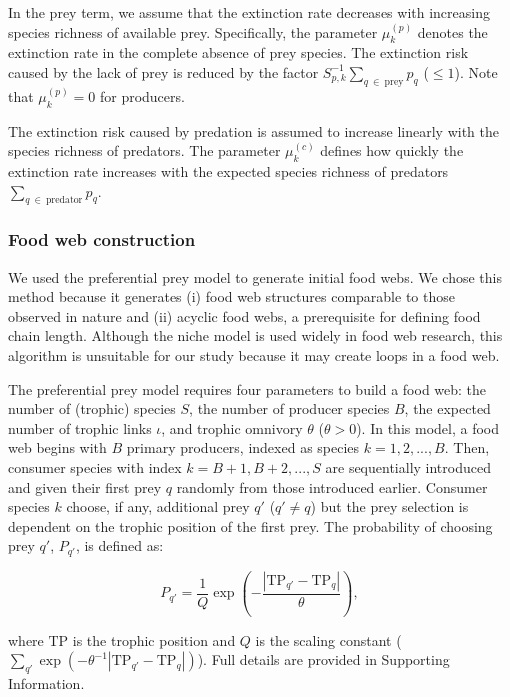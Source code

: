 \documentclass[11pt, class=article, crop=false]{standalone}
\begin{document}
In the prey term, we assume that the extinction rate decreases with increasing species richness of available prey.
Specifically, the parameter $\mu_{k}^{(p)}$ denotes the extinction rate in the complete absence of prey species.
The extinction risk caused by the lack of prey is reduced by the factor $S_{p, k}^{-1} \sum_{q~\in~\text{prey}} p_{q}$ ($\le 1$).
Note that $\mu_{k}^{(p)} = 0$ for producers.

The extinction risk caused by predation is assumed to increase linearly with the species richness of predators.
The parameter $\mu_{k}^{(c)}$ defines how quickly the extinction rate increases with the expected species richness of predators $\sum_{q~\in~\text{predator}} p_{q}$.

\subsubsection{Food web construction}

We used the preferential prey model to generate initial food webs.
We chose this method because it generates (i) food web structures comparable to those observed in nature and (ii) acyclic food webs, a prerequisite for defining food chain length.
Although the niche model is used widely in food web research, this algorithm is unsuitable for our study because it may create loops in a food web.

The preferential prey model requires four parameters to build a food web: the number of (trophic) species $S$, the number of producer species $B$, the expected number of trophic links $\iota$, and trophic omnivory $\theta$ ($\theta > 0$).
In this model, a food web begins with $B$ primary producers, indexed as species $k = 1, 2, ..., B$.
Then, consumer species with index $k = B + 1, B + 2, ..., S$ are sequentially introduced and given their first prey $q$ randomly from those introduced earlier.
Consumer species $k$ choose, if any, additional prey $q'$ ($q' \ne q$) but the prey selection is dependent on the trophic position of the first prey.
The probability of choosing prey $q'$, $P_{q'}$, is defined as:

\begin{equation}
    P_{q'} = \frac{1}{Q} \exp(-\frac{|\mbox{TP}_{q'} - \mbox{TP}_q|}{\theta}),
\end{equation}

where $\mbox{TP}$ is the trophic position and $Q$ is the scaling constant ($\sum_{q'} \exp(-\theta^{-1} |\mbox{TP}_{q'} - \mbox{TP}_q|)$).
Full details are provided in Supporting Information.
\end{document}
